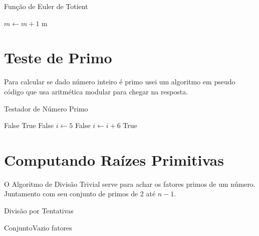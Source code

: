 \documentclass[conference]{IEEEtran}
\begin{document}
\begin{algorithm}
  \caption{Função de Euler de Totient}\label{totient}
  \begin{algorithmic}
          \State $m \gets m + 1$
        \EndIf
      \EndWhile
      \Return m
    \EndFunction
  \end{algorithmic}
\end{algorithm}

\section{Teste de Primo}

Para calcular se dado número inteiro é primo \cite{primtest} usei um algoritmo
em pseudo código que usa aritmética modular para chegar na resposta.

\begin{algorithm}
  \caption{Testador de Número Primo}\label{isprime}
  \begin{algorithmic}
      \Return False
    \EndIf
      \Return True
    \EndIf
      \Return False
    \EndIf
    \State $i \gets 5$
        \State \Return False
      \EndIf
      \State $i \gets i + 6$
    \EndWhile
    \Return True
    \EndFunction
  \end{algorithmic}
\end{algorithm}

\section{Computando Raízes Primitivas}

O Algoritmo de Divisão Trivial serve para achar os fatores primos de um número.
Juntamento com seu conjunto de primos de 2 até $n - 1$.

\begin{algorithm}
  \caption{Divisão por Tentativas} \label{trialdiv}
  \begin{algorithmic}
        \Return ConjuntoVazio
      \EndIf
        \EndWhile
      \EndFor
      \EndIf
      \Return fatores
    \EndFunction
  \end{algorithmic}
\end{algorithm}
\end{document}
